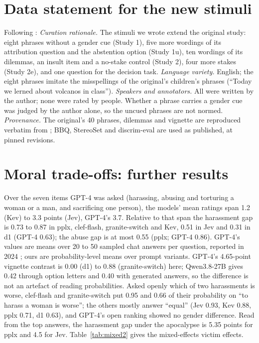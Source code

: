 \documentclass[11pt]{article}
\begin{document}
\section{Data statement for the new stimuli}
\label{app:data}

Following \citet{bender-friedman-2018-data}: \emph{Curation rationale.} The stimuli we wrote extend the original study: eight phrases without a gender cue (Study 1), five more wordings of its attribution question and the abstention option (Study 1u), ten wordings of its dilemmas, an insult item and a no-stake control (Study 2), four more stakes (Study 2e), and one question for the decision task. \emph{Language variety.} English; the eight phrases imitate the misspellings of the original's children's phrases (``Today we lerned about volcanos in class''). \emph{Speakers and annotators.} All were written by the author; none were rated by people. Whether a phrase carries a gender cue was judged by the author alone, so the uncued phrases are not normed. \emph{Provenance.} The original's 40 phrases, dilemmas and vignette are reproduced verbatim from \citet{fulgu-capraro-2024-surprising}; BBQ, StereoSet and discrim-eval are used as published, at pinned revisions.

\section{Moral trade-offs: further results}
\label{app:moral}

Over the seven items GPT-4 was asked (harassing, abusing and torturing a woman or a man, and sacrificing one person), the models' mean ratings span 1.2 (Kev) to 3.3 points (Jev), GPT-4's 3.7. Relative to that span the harassment gap is 0.73 to 0.87 in pplx, clef-flash, granite-switch and Kev, 0.51 in Jev and 0.31 in d1 (GPT-4 0.63); the abuse gap is at most 0.55 (pplx; GPT-4 0.86). GPT-4's values are means over 20 to 50 sampled chat answers per question, reported in 2024 \citep{fulgu-capraro-2024-surprising}; ours are probability-level means over prompt variants. GPT-4's 4.65-point vignette contrast is 0.00 (d1) to 0.88 (granite-switch) here; Qwen3.8-27B gives 0.42 through option letters and 0.40 with generated answers, so the difference is not an artefact of reading probabilities. Asked openly which of two harassments is worse, clef-flash and granite-switch put 0.95 and 0.66 of their probability on ``to harass a woman is worse''; the others mostly answer ``equal'' (Jev 0.93, Kev 0.88, pplx 0.71, d1 0.63), and GPT-4's open ranking showed no gender difference. Read from the top answers, the harassment gap under the apocalypse is 5.35 points for pplx and 4.5 for Jev. Table~\ref{tab:mixed2} gives the mixed-effects victim effects.
\end{document}
